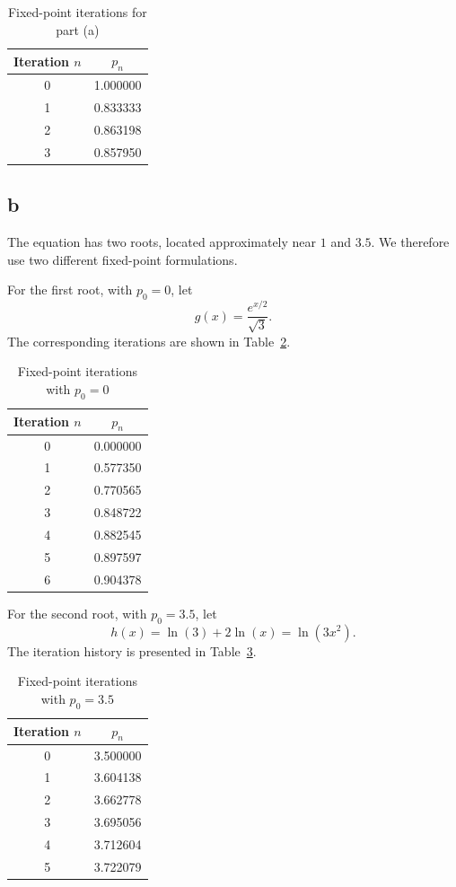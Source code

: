 \documentclass[11pt,a4paper]{report}
\theoremstyle{remark}
\begin{document}
\begin{table}[htbp]
\centering
\caption{Fixed-point iterations for part (a)}
\label{tab:fixed1}
\begin{tabular}{cc}
\hline
Iteration $n$ & $p_n$\\
\hline
0 & 1.000000\\
1 & 0.833333\\
2 & 0.863198\\
3 & 0.857950\\
\hline
\end{tabular}
\end{table}

\subsection*{b}
The equation has two roots, located approximately near $1$ and $3.5$. We therefore use two different fixed-point formulations.

For the first root, with $p_0=0$, let
\[
g(x)=\frac{e^{x/2}}{\sqrt{3}}.
\]
The corresponding iterations are shown in Table~\ref{tab:fixed2}.

\begin{table}[htbp]
\centering
\caption{Fixed-point iterations with $p_0=0$}
\label{tab:fixed2}
\begin{tabular}{cc}
\hline
Iteration $n$ & $p_n$\\
\hline
0 & 0.000000\\
1 & 0.577350\\
2 & 0.770565\\
3 & 0.848722\\
4 & 0.882545\\
5 & 0.897597\\
6 & 0.904378\\
\hline
\end{tabular}
\end{table}

For the second root, with $p_0=3.5$, let
\[
h(x)=\ln(3)+2\ln(x)=\ln(3x^2).
\]
The iteration history is presented in Table~\ref{tab:fixed3}.

\begin{table}[htbp]
\centering
\caption{Fixed-point iterations with $p_0=3.5$}
\label{tab:fixed3}
\begin{tabular}{cc}
\hline
Iteration $n$ & $p_n$\\
\hline
0 & 3.500000\\
1 & 3.604138\\
2 & 3.662778\\
3 & 3.695056\\
4 & 3.712604\\
5 & 3.722079\\
\hline
\end{tabular}
\end{table}
\end{document}
